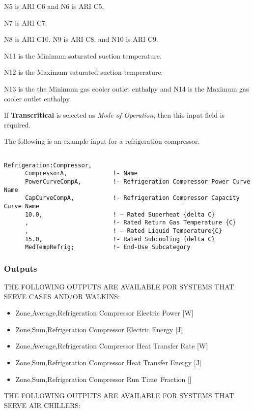 N5 is ARI C6 and N6 is ARI C5,

N7 is ARI C7.

N8 is ARI C10, N9 is ARI C8, and N10 is ARI C9.

N11 is the Minimum saturated suction temperature.

N12 is the Maximum saturated suction temperature.

N13 is the the Minimum gas cooler outlet enthalpy and N14 is the Maximum gas cooler outlet enthalpy.

If \textbf{Transcritical} is selected as \textit{Mode of Operation}, then this input field is required.

The following is an example input for a refrigeration compressor.

\begin{lstlisting}

Refrigeration:Compressor,
      CompressorA,             !- Name
      PowerCurveCompA,         !- Refrigeration Compressor Power Curve Name
      CapCurveCompA,           !- Refrigeration Compressor Capacity Curve Name
      10.0,                    ! – Rated Superheat {delta C}
      ,                        !- Rated Return Gas Temperature {C}
      ,                        ! – Rated Liquid Temperature{C}
      15.0,                    !- Rated Subcooling {delta C}
      MedTempRefrig;           !- End-Use Subcategory
\end{lstlisting}

\subsubsection{Outputs}\label{outputs-4-013}

THE FOLLOWING OUTPUTS ARE AVAILABLE FOR SYSTEMS THAT SERVE CASES AND/OR WALKINS:

\begin{itemize}
\item
  Zone,Average,Refrigeration Compressor Electric Power {[}W{]}
\item
  Zone,Sum,Refrigeration Compressor Electric Energy {[}J{]}
\item
  Zone,Average,Refrigeration Compressor Heat Transfer Rate {[}W{]}
\item
  Zone,Sum,Refrigeration Compressor Heat Transfer Energy {[}J{]}
\item
  Zone,Sum,Refrigeration Compressor Run Time~Fraction {[]}
\end{itemize}

THE FOLLOWING OUTPUTS ARE AVAILABLE FOR SYSTEMS THAT SERVE AIR CHILLERS:

